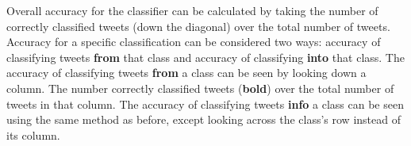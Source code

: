 \documentclass[12pt]{ucthesis}
\begin{document}
Overall accuracy for the classifier can be calculated by taking the number of correctly classified tweets (down the diagonal) over the total number of tweets.
Accuracy for a specific classification can be considered two ways: accuracy of classifying tweets \textbf{from} that class and accuracy of classifying \textbf{into} that class.
The accuracy of classifying tweets \textbf{from} a class can be seen by looking down a column.
The number correctly classified tweets (\textbf{bold}) over the total number of tweets in that column.
The accuracy of classifying tweets \textbf{info} a class can be seen using the same method as before, except looking across the class's row instead of its column.

\begin{table}[H]
   \begin{center}
      \caption[Example Classification Confusion Matrix]{An example confusion matrix for a classifier. The \texttt{undecided} class was removed because there were no tweets in that class.}
      \label{table:confusionExample}
   \end{center}
\end{table}
\end{document}
